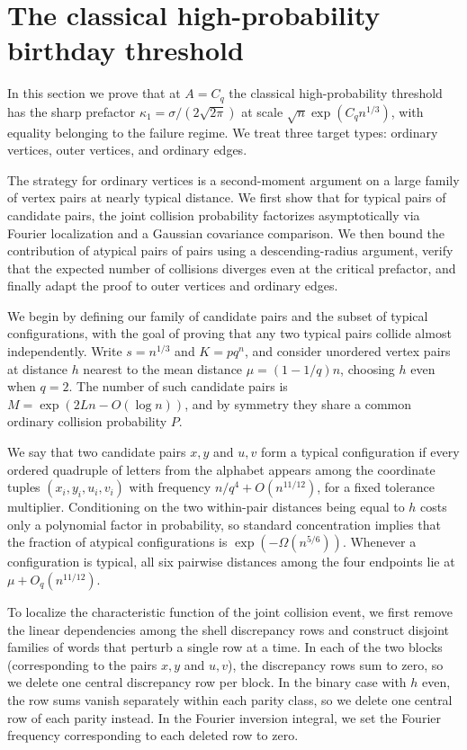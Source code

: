 \section{The classical high-probability birthday threshold}
\label{sec:classical-birthday}

In this section we prove that at \(A=C_q\) the classical high-probability threshold has the sharp prefactor \(\kappa_1=\sigma/(2\sqrt{2\pi})\) at scale \(\sqrt n\exp(C_q n^{1/3})\), with equality belonging to the failure regime. We treat three target types: ordinary vertices, outer vertices, and ordinary edges.

The strategy for ordinary vertices is a second-moment argument on a large family of vertex pairs at nearly typical distance. We first show that for typical pairs of candidate pairs, the joint collision probability factorizes asymptotically via Fourier localization and a Gaussian covariance comparison. We then bound the contribution of atypical pairs of pairs using a descending-radius argument, verify that the expected number of collisions diverges even at the critical prefactor, and finally adapt the proof to outer vertices and ordinary edges.

We begin by defining our family of candidate pairs and the subset of typical configurations, with the goal of proving that any two typical pairs collide almost independently. Write \(s=n^{1/3}\) and \(K=pq^n\), and consider unordered vertex pairs at distance \(h\) nearest to the mean distance \(\mu=(1-1/q)n\), choosing \(h\) even when \(q=2\). The number of such candidate pairs is \(M=\exp(2Ln-O(\log n))\), and by symmetry they share a common ordinary collision probability \(P\).

We say that two candidate pairs \(x,y\) and \(u,v\) form a typical configuration if every ordered quadruple of letters from the alphabet appears among the coordinate tuples \((x_i,y_i,u_i,v_i)\) with frequency \(n/q^4+O(n^{11/12})\), for a fixed tolerance multiplier. Conditioning on the two within-pair distances being equal to \(h\) costs only a polynomial factor in probability, so standard concentration implies that the fraction of atypical configurations is \(\exp(-\Omega(n^{5/6}))\). Whenever a configuration is typical, all six pairwise distances among the four endpoints lie at \(\mu+O_q(n^{11/12})\).

To localize the characteristic function of the joint collision event, we first remove the linear dependencies among the shell discrepancy rows and construct disjoint families of words that perturb a single row at a time. In each of the two blocks (corresponding to the pairs \(x,y\) and \(u,v\)), the discrepancy rows sum to zero, so we delete one central discrepancy row per block. In the binary case with \(h\) even, the row sums vanish separately within each parity class, so we delete one central row of each parity instead. In the Fourier inversion integral, we set the Fourier frequency corresponding to each deleted row to zero.

